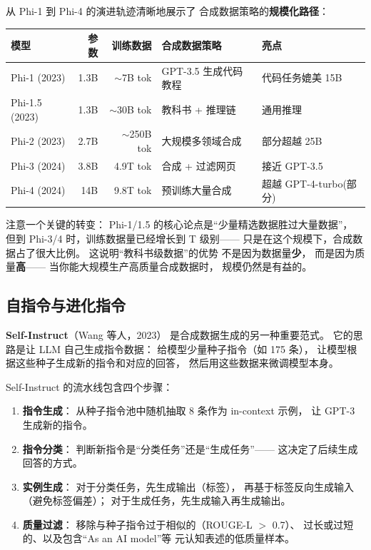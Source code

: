 从 Phi-1 到 Phi-4 的演进轨迹清晰地展示了
合成数据策略的\textbf{规模化路径}：

\begin{center}
\small
\begin{tabular}{lrrll}
\hline
\textbf{模型} & \textbf{参数} & \textbf{训练数据} & \textbf{合成数据策略} & \textbf{亮点} \\
\hline
Phi-1 (2023) & 1.3B & $\sim$7B tok & GPT-3.5 生成代码教程 & 代码任务媲美 15B \\
Phi-1.5 (2023) & 1.3B & $\sim$30B tok & 教科书 + 推理链 & 通用推理 \\
Phi-2 (2023) & 2.7B & $\sim$250B tok & 大规模多领域合成 & 部分超越 25B \\
Phi-3 (2024) & 3.8B & 4.9T tok & 合成 + 过滤网页 & 接近 GPT-3.5 \\
Phi-4 (2024) & 14B & 9.8T tok & 预训练大量合成 & 超越 GPT-4-turbo(部分) \\
\hline
\end{tabular}
\end{center}

注意一个关键的转变：
Phi-1/1.5 的核心论点是``少量精选数据胜过大量数据''，
但到 Phi-3/4 时，训练数据量已经增长到 T 级别——
只是在这个规模下，合成数据占了很大比例。
这说明``教科书级数据''的优势
不是因为数据量\textbf{少}，
而是因为质量\textbf{高}——
当你能大规模生产高质量合成数据时，
规模仍然是有益的。

\subsection{自指令与进化指令}

\textbf{Self-Instruct}（Wang 等人，2023）
是合成数据生成的另一种重要范式。
它的思路是让 LLM 自己生成指令数据：
给模型少量种子指令（如 175 条），
让模型根据这些种子生成新的指令和对应的回答，
然后用这些数据来微调模型本身。

Self-Instruct 的流水线包含四个步骤：
\begin{enumerate}[noitemsep]
  \item \textbf{指令生成}：
        从种子指令池中随机抽取 8 条作为 in-context 示例，
        让 GPT-3 生成新的指令。
  \item \textbf{指令分类}：
        判断新指令是``分类任务''还是``生成任务''——
        这决定了后续生成回答的方式。
  \item \textbf{实例生成}：
        对于分类任务，先生成输出（标签），
        再基于标签反向生成输入（避免标签偏差）；
        对于生成任务，先生成输入再生成输出。
  \item \textbf{质量过滤}：
        移除与种子指令过于相似的（ROUGE-L $>$ 0.7）、
        过长或过短的、以及包含``As an AI model''等
        元认知表述的低质量样本。
\end{enumerate}

